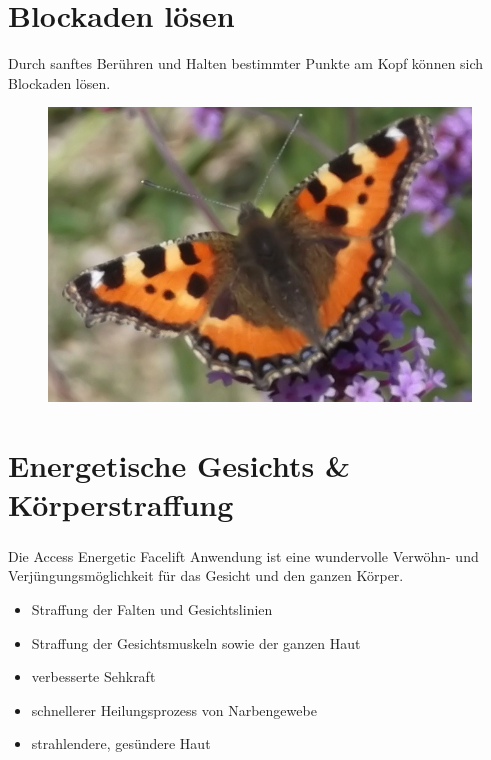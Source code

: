\documentclass[10pt,foldmark,notumble]{leaflet}
\begin{document}
\newpage
\vspace*{10mm}

\section{Blockaden lösen}
Durch sanftes Berühren und Halten bestimmter Punkte am Kopf können sich Blockaden lösen. 

\vspace*{15mm}
\begin{figure}[h] %
\begin{center}
\includegraphics [scale=.38]{Schmetterling3.JPG}
\end{center}
\end{figure}


\section{Energetische Gesichts \& Körperstraffung}
Die Access Energetic Facelift\textsuperscript{\textregistered} Anwendung ist eine wundervolle Verwöhn- und Verjüngungsmöglichkeit für das Gesicht und den ganzen Körper.

\begin{itemize}
\item Straffung der Falten und Gesichtslinien
\item Straffung der Gesichtsmuskeln sowie der ganzen Haut
\item verbesserte Sehkraft
\item schnellerer Heilungsprozess von Narbengewebe
\item strahlendere, gesündere Haut
\end{itemize}
\end{document}
